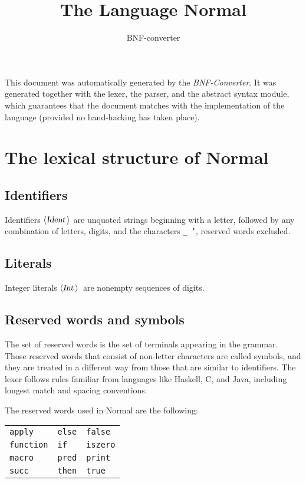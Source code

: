 \documentclass[a4paper,11pt]{article}
\title{The Language Normal}
\author{BNF-converter}
\begin{document}
\maketitle


\newcommand{\emptyP}{\mbox{$\epsilon$}}
\newcommand{\terminal}[1]{\mbox{{\texttt {#1}}}}
\newcommand{\nonterminal}[1]{\mbox{$\langle \mbox{{\sl #1 }} \! \rangle$}}
\newcommand{\arrow}{\mbox{::=}}
\newcommand{\delimit}{\mbox{$|$}}
\newcommand{\reserved}[1]{\mbox{{\texttt {#1}}}}
\newcommand{\literal}[1]{\mbox{{\texttt {#1}}}}
\newcommand{\symb}[1]{\mbox{{\texttt {#1}}}}

This document was automatically generated by the {\em BNF-Converter}.
It was generated together with the lexer, the parser, and the
abstract syntax module, which guarantees that the document
matches with the implementation of the language
(provided no hand-hacking has taken place).

\section*{The lexical structure of Normal}

\subsection*{Identifiers}
Identifiers \nonterminal{Ident} are unquoted strings beginning with a letter,
followed by any combination of letters, digits, and the characters {\tt \_ '},
reserved words excluded.
\subsection*{Literals}
Integer literals \nonterminal{Int}\ are nonempty sequences of digits.

\subsection*{Reserved words and symbols}
The set of reserved words is the set of terminals appearing in the grammar. Those reserved words that consist of non-letter characters are called symbols, and they are treated in a different way from those that are similar to identifiers. The lexer follows rules familiar from languages like Haskell, C, and Java, including longest match and spacing conventions.

The reserved words used in Normal are the following: \\

\begin{tabular}{lll}
{\reserved{apply}} &{\reserved{else}} &{\reserved{false}} \\
{\reserved{function}} &{\reserved{if}} &{\reserved{iszero}} \\
{\reserved{macro}} &{\reserved{pred}} &{\reserved{print}} \\
{\reserved{succ}} &{\reserved{then}} &{\reserved{true}} \\
\end{tabular}\\
\end{document}
